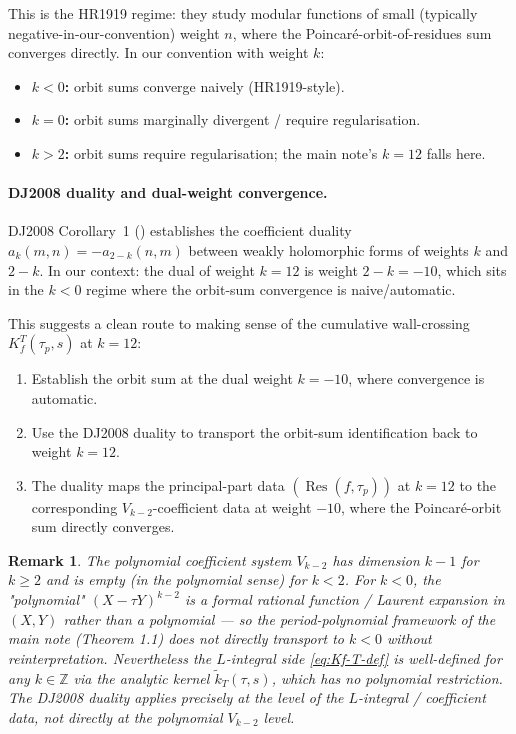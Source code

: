 \documentclass[11pt]{article}
\newtheorem{remark}[theorem]{Remark}
\newcommand{\ZZ}{\mathbb{Z}}
\DeclareMathOperator{\Res}{Res}
\begin{document}
This is the HR1919 regime: they study modular functions of small
(typically negative-in-our-convention) weight $n$, where the
Poincar\'e-orbit-of-residues sum converges directly.  In our
convention with weight $k$:
\begin{itemize}\itemsep0.2em
\item \textbf{$k < 0$:} orbit sums converge naively (HR1919-style).
\item \textbf{$k = 0$:} orbit sums marginally divergent / require
  regularisation.
\item \textbf{$k > 2$:} orbit sums require regularisation; the
  main note's $k = 12$ falls here.
\end{itemize}

\paragraph{DJ2008 duality and dual-weight convergence.}
DJ2008 Corollary~1 (\cite[Cor.~1]{DJ2008}) establishes the
coefficient duality $a_k(m, n) = -a_{2-k}(n, m)$ between weakly
holomorphic forms of weights $k$ and $2 - k$.  In our context:
the dual of weight $k = 12$ is weight $2 - k = -10$, which sits in
the $k < 0$ regime where the orbit-sum convergence is
naive/automatic.

This suggests a clean route to making sense of the cumulative
wall-crossing $K_f^T(\tau_p, s)$ at $k = 12$:
\begin{enumerate}\itemsep0.2em
\item Establish the orbit sum at the dual weight $k = -10$, where
  convergence is automatic.
\item Use the DJ2008 duality to transport the orbit-sum identification
  back to weight $k = 12$.
\item The duality maps the principal-part data
  $(\Res(f, \tau_p))$ at $k = 12$ to the corresponding
  $V_{k-2}$-coefficient data at weight $-10$, where the
  Poincar\'e-orbit sum directly converges.
\end{enumerate}

\begin{remark}
The polynomial coefficient system $V_{k - 2}$ has dimension $k - 1$
for $k \ge 2$ and is empty (in the polynomial sense) for $k < 2$.
For $k < 0$, the "polynomial" $(X - \tau Y)^{k - 2}$ is a formal
rational function / Laurent expansion in $(X, Y)$ rather than a
polynomial — so the period-polynomial framework of the main note
(Theorem 1.1) does not directly transport to $k < 0$ without
reinterpretation.  Nevertheless the $L$-integral side
\eqref{eq:Kf-T-def} is well-defined for any $k \in \ZZ$ via the
analytic kernel $\widetilde{k}_T(\tau, s)$, which has no polynomial
restriction.  The DJ2008 duality applies precisely at the level of
the $L$-integral / coefficient data, not directly at the polynomial
$V_{k - 2}$ level.
\end{remark}
\end{document}
